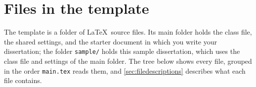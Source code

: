 
\chapter{Files in the template}
\label{app:filetree}

The template is a folder of \LaTeX\ source files. Its main folder holds the class file, the shared settings, and the starter document in which you write your dissertation; the folder \texttt{sample/} holds this sample dissertation, which uses the class file and settings of the main folder. The tree below shows every file, grouped in the order \texttt{main.tex} reads them, and \cref{sec:filedescriptions} describes what each file contains.

